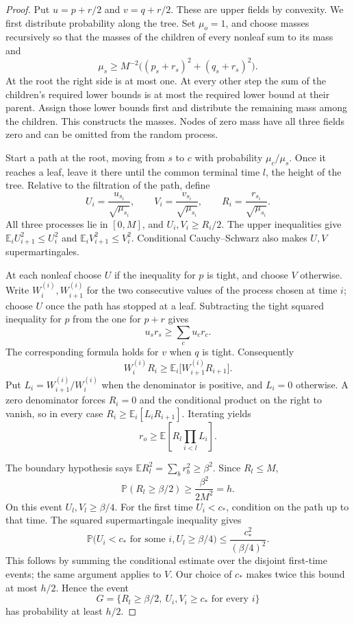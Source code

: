\begin{proof}
Put $u=p+r/2$ and $v=q+r/2$.  These are upper fields by convexity.
We first distribute probability along the tree.  Set $\mu_o=1$, and
choose masses recursively so that the masses of the children of every
nonleaf sum to its mass and
\begin{equation}\label{log:masses}
 \mu_s\ge M^{-2}\bigl((p_s+r_s)^2+(q_s+r_s)^2\bigr).
\end{equation}
At the root the right side is at most one.  At every other step the
sum of the children's required lower bounds is at most the required
lower bound at their parent.  Assign those lower bounds first and
distribute the remaining mass among the children.  This constructs
the masses.  Nodes of zero mass have all three fields zero and can
be omitted from the random process.

Start a path at the root, moving from $s$ to $c$ with probability
$\mu_c/\mu_s$.  Once it reaches a leaf, leave it there until the common
terminal time $l$, the height of the tree.  Relative to the filtration
of the path, define
\[
 U_i=\frac{u_{s_i}}{\sqrt{\mu_{s_i}}},\qquad
 V_i=\frac{v_{s_i}}{\sqrt{\mu_{s_i}}},\qquad
 R_i=\frac{r_{s_i}}{\sqrt{\mu_{s_i}}}.
\]
All three processes lie in $[0,M]$, and $U_i,V_i\ge R_i/2$.
The upper inequalities give
$\mathbb E_i U_{i+1}^2\le U_i^2$ and
$\mathbb E_i V_{i+1}^2\le V_i^2$.
Conditional Cauchy--Schwarz also makes $U,V$ supermartingales.

At each nonleaf choose $U$ if the inequality for $p$ is tight, and
choose $V$ otherwise.  Write $W_i^{(i)},W_{i+1}^{(i)}$ for the two
consecutive values of the process chosen at time $i$; choose $U$ once
the path has stopped at a leaf.  Subtracting the tight squared
inequality for $p$ from the one for $p+r$ gives
\[
 u_sr_s\ge\sum_c u_cr_c.
\]
The corresponding formula holds for $v$ when $q$ is tight.
Consequently
\[
 W_i^{(i)}R_i\ge
 \mathbb E_i\bigl[W_{i+1}^{(i)}R_{i+1}\bigr].
\]
Put $L_i=W_{i+1}^{(i)}/W_i^{(i)}$ when the denominator is positive,
and $L_i=0$ otherwise.  A zero denominator forces $R_i=0$ and the
conditional product on the right to vanish, so in every case
$R_i\ge\mathbb E_i[L_iR_{i+1}]$.  Iterating yields
\begin{equation}\label{log:product}
 r_o\ge\mathbb E\left[R_l\prod_{i<l}L_i\right].
\end{equation}

The boundary hypothesis says
$\mathbb ER_l^2=\sum_b r_b^2\ge\beta^2$.  Since $R_l\le M$,
\[
 \mathbb P(R_l\ge\beta/2)\ge\frac{\beta^2}{2M^2}=h.
\]
On this event $U_l,V_l\ge\beta/4$.  For the first time $U_i<c_*$,
condition on the path up to that time.  The squared supermartingale
inequality gives
\[
 \mathbb P\bigl(U_i<c_*\text{ for some }i, U_l\ge\beta/4\bigr)
 \le\frac{c_*^2}{(\beta/4)^2}.
\]
This follows by summing the conditional estimate over the disjoint
first-time events; the same argument applies to $V$.  Our choice of
$c_*$ makes twice this bound at most $h/2$.  Hence the event
\begin{equation}\label{log:good-event}
 G=\{R_l\ge\beta/2,\ U_i,V_i\ge c_*\text{ for every }i\}
\end{equation}
has probability at least $h/2$.


\end{proof}
